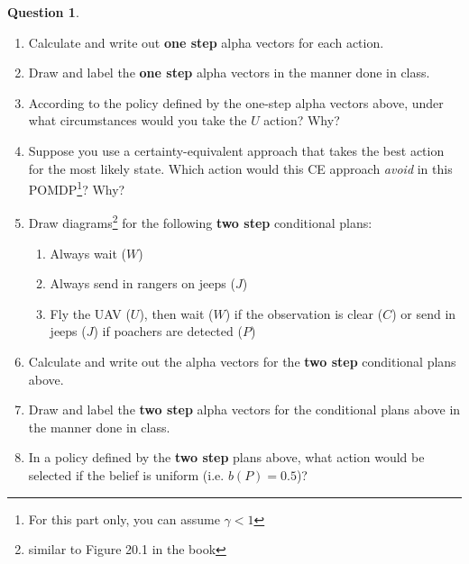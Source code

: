 \documentclass{article}
\theoremstyle{definition}
\newtheorem{question}[thm]{Question}
\begin{document}
\begin{question}
    \begin{enumerate}[label=\alph*)]
        \item Calculate and write out \textbf{one step} alpha vectors for each action.
        \item Draw and label the \textbf{one step} alpha vectors in the manner done in class.
        \item According to the policy defined by the one-step alpha vectors above, under what circumstances would you take the $U$ action? Why?
        \item Suppose you use a certainty-equivalent approach that takes the best action for the most likely state. Which action would this CE approach \emph{avoid} in this POMDP\footnote{For this part only, you can assume $\gamma<1$}? Why?
        \item Draw diagrams\footnote{similar to Figure 20.1 in the book} for the following \textbf{two step} conditional plans:
            \begin{enumerate}
                \item Always wait ($W$)
                \item Always send in rangers on jeeps ($J$)
                \item Fly the UAV ($U$), then wait ($W$) if the observation is clear ($C$) or send in jeeps ($J$) if poachers are detected ($P$)
            \end{enumerate}
        \item Calculate and write out the alpha vectors for the \textbf{two step} conditional plans above.
        \item Draw and label the \textbf{two step} alpha vectors for the conditional plans above in the manner done in class.
        \item In a policy defined by the \textbf{two step} plans above, what action would be selected if the belief is uniform (i.e. $b(P) = 0.5$)?
    \end{enumerate}
\end{question}
\end{document}
